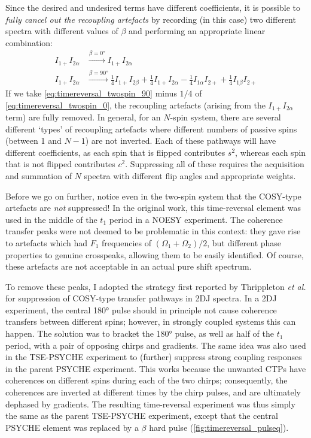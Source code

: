 Since the desired and undesired terms have different coefficients, it is possible to \textit{fully cancel out the recoupling artefacts} by recording (in this case) two different spectra with different values of $\beta$ and performing an appropriate linear combination:
\begin{align}
    I_{1+}I_{2\alpha} &\xrightarrow{\beta = \ang{0}} I_{1+}I_{2\alpha} \label{eq:timereversal_twospin_0} \\
    I_{1+}I_{2\alpha} &\xrightarrow{\beta = \ang{90}} \frac{1}{4}I_{1+}I_{2\beta} + \frac{1}{4}I_{1+}I_{2\alpha} - \frac{1}{4}I_{1\alpha}I_{2+} + \frac{1}{4}I_{1\beta}I_{2+} \label{eq:timereversal_twospin_90}
\end{align}
If we take \cref{eq:timereversal_twospin_90} minus $1/4$ of \cref{eq:timereversal_twospin_0}, the recoupling artefacts (arising from the $I_{1+}I_{2\alpha}$ term) are fully removed.
In general, for an $N$-spin system, there are several different `types' of recoupling artefacts where different numbers of passive spins (between 1 and $N - 1$) are not inverted.
Each of these pathways will have different coefficients, as each spin that is flipped contributes $s^2$, whereas each spin that is not flipped contributes $c^2$.
Suppressing all of these requires the acquisition and summation of $N$ spectra with different flip angles and appropriate weights.

Before we go on further, notice even in the two-spin system that the COSY-type artefacts are \textit{not} suppressed!
In the original work\autocite{Sorensen1985JACS}, this time-reversal element was used in the middle of the $t_1$ period in a NOESY experiment.
The coherence transfer peaks were not deemed to be problematic in this context: they gave rise to artefacts which had $F_1$ frequencies of $(\Omega_1 + \Omega_2)/2$, but different phase properties to genuine crosspeaks, allowing them to be easily identified.
Of course, these artefacts are not acceptable in an actual pure shift spectrum.

To remove these peaks, I adopted the strategy first reported by Thrippleton \textit{et al.} for suppression of COSY-type transfer pathways in 2DJ spectra.\autocite{Thrippleton2005JMR}
In a 2DJ experiment, the central \ang{180} pulse should in principle not cause coherence transfers between different spins; however, in strongly coupled systems this can happen.
The solution was to bracket the \ang{180} pulse, as well as half of the $t_1$ period, with a pair of opposing chirps and gradients.
The same idea was also used in the TSE-PSYCHE experiment\autocite{Foroozandeh2015CC} to (further) suppress strong coupling responses in the parent PSYCHE experiment.
This works because the unwanted CTPs have coherences on different spins during each of the two chirps; consequently, the coherences are inverted at different times by the chirp pulses, and are ultimately dephased by gradients.
The resulting time-reversal experiment was thus simply the same as the parent TSE-PSYCHE experiment, except that the central PSYCHE element was replaced by a $\beta$ hard pulse (\cref{fig:timereversal_pulseq}).


